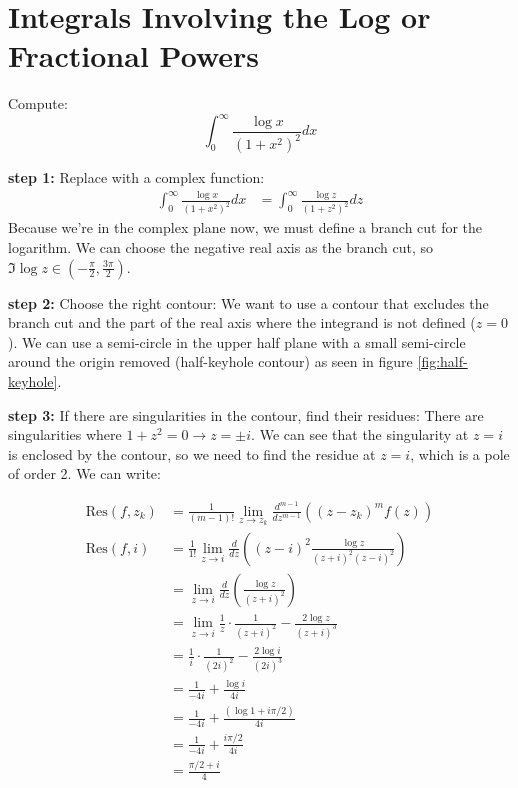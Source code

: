 \section{Integrals Involving the Log or Fractional Powers}
\begin{example}
    Compute:
    $$\int_{0}^{\infty} \frac{\log x}{(1 + x^2)^2} dx$$

    \textbf{step 1:} Replace with a complex function:
    \begin{align*}
        \int_{0}^{\infty} \frac{\log x}{(1 + x^2)^2} dx & = \int_{0}^{\infty} \frac{\log z}{(1 + z^2)^2} dz
    \end{align*}
    Because we're in the complex plane now, we must define a branch cut for the logarithm. We can choose the negative real axis as the branch cut, so $\Im{\log z} \in (-\frac{\pi}{2}, \frac{3\pi}{2})$.

    \textbf{step 2:} Choose the right contour:
    We want to use a contour that excludes the branch cut and the part of the real axis where the integrand is not defined ($z = 0$). We can use a semi-circle in the upper half plane with a small semi-circle around the origin removed (half-keyhole contour) as seen in figure \ref{fig:half-keyhole}.

    \textbf{step 3:} If there are singularities in the contour, find their residues:
    There are singularities where $1 + z^2 = 0 \rightarrow z = \pm i$. We can see that the singularity at $z = i$ is enclosed by the contour, so we need to find the residue at $z = i$, which is a pole of order 2. We can write:

    \begin{align}
        \text{Res}(f,z_k) & = \frac{1}{(m - 1)!}\lim_{z \to z_k} \frac{d^{m-1}}{dz^{m-1}} \left( (z - z_k)^m f(z) \right)        \\
        \text{Res}(f,i)   & = \frac{1}{1!}\lim_{z \to i} \frac{d}{dz} \left( (z - i)^2 \frac{\log z}{(z + i)^2(z - i)^2} \right) \\
                          & = \lim_{z \to i} \frac{d}{dz} \left( \frac{\log z}{(z + i)^2} \right)                                \\
                          & = \lim_{z \to i} \frac{1}{z} \cdot \frac{1}{(z + i)^2} - \frac{2\log z}{(z + i)^3}                   \\
                          & = \frac{1}{i} \cdot \frac{1}{(2i)^2} - \frac{2\log i}{(2i)^3}                                        \\
                          & = \frac{1}{-4i} + \frac{\log i}{4i}                                                                  \\
                          & = \frac{1}{-4i} + \frac{(\log 1 + i\pi/2)}{4i}                                                       \\
                          & = \frac{1}{-4i} + \frac{i\pi/2}{4i}                                                                  \\
                          & = \frac{\pi/2 + i}{4}
    \end{align}


\end{example}
